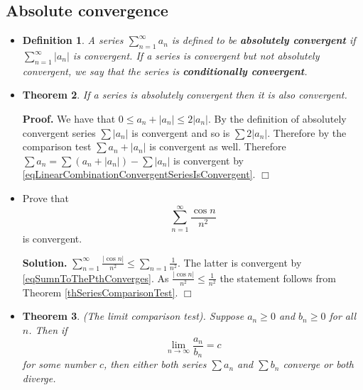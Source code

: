 \documentclass[12pt]{book}
\newenvironment{proof}[1][]{ \textbf{Proof#1.} }{$\Box$\medskip}
\newenvironment{solution}{\textbf{Solution.} }{$\Box$}
\newtheorem{theorem}{Theorem}[section]
\newtheorem{definition}[theorem]{Definition}
\renewcommand{\emph}{\textbf}
\begin{document}
\subsection{Absolute convergence}
\begin{itemize}

\item 
\begin{definition}
A series $\sum_{n=1}^\infty a_n$ is defined to be \emph{absolutely convergent} if $\sum_{n=1}^\infty |a_n|$ is convergent.  If a series is convergent but not absolutely convergent, we say that the series is \emph{conditionally convergent}. 
\end{definition}

\item 
\begin{theorem} \label{thAbsoluteConvergenceImpliesConvergence}
If a series is absolutely convergent then it is also convergent. 
\end{theorem}

\begin{proof}
We have that $0\leq a_n+|a_n|\leq 2|a_n|$. By the definition of absolutely convergent series $\sum |a_n|$ is convergent and so is $\sum 2|a_n|$. Therefore by the comparison test $\sum a_n+|a_n|$ is convergent as well. Therefore $\sum a_n= \sum (a_n+|a_n|)-\sum |a_n|$  is convergent by \eqref{eqLinearCombinationConvergentSeriesIsConvergent}.
\end{proof}
\item Prove that 
\[
\sum_{n=1}^{\infty} \frac{\cos n}{n^2}
\]
is convergent.

\begin{solution}
$\sum\limits_{n=1}^{\infty} \frac{|\cos n |}{n^2} \leq \sum\limits_{n=1}\frac{1}{n^2}$. The latter is convergent by \eqref{eqSumnToThePthConverges}. As $\frac{|\cos n|}{n^2}\leq \frac{1}{n^2}$ the statement follows from Theorem \ref{thSeriesComparisonTest}.
\end{solution}


\item 
\begin{theorem}\label{thSeriesTwoSeriesRatioTest}
(The limit comparison test). Suppose $a_n\geq 0$ and $b_n\geq 0$ for all $n$. Then if 
\[\lim\limits_{n\to \infty} \frac{a_n}{b_n}= c 
\]
for some number $c$, then either both series $\sum a_n$ and $\sum b_n $ converge or both diverge.
\end{theorem}


\end{itemize}
\end{document}

